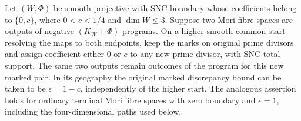 \begin{lemma}
\label{bd:higher-start}
Let $(W,\Phi)$ be smooth projective with SNC boundary whose
coefficients belong to $\{0,c\}$, where $0<c<1/4$ and
$\dim W\leq3$.  Suppose two Mori fibre spaces are outputs of
negative $(K_W+\Phi)$ programs. On a higher smooth common
start resolving the maps to both endpoints, keep the marks on
original prime divisors and assign
coefficient either $0$ or $c$ to any new prime divisor, with
SNC total support.  The same two outputs remain outcomes of
the program for this new marked pair.  In its geography the
original marked discrepancy bound can be taken to be
$\epsilon=1-c$, independently of the higher start.
The analogous assertion holds for ordinary terminal Mori
fibre spaces with zero boundary and $\epsilon=1$, including
the four-dimensional paths used below.
\end{lemma}

